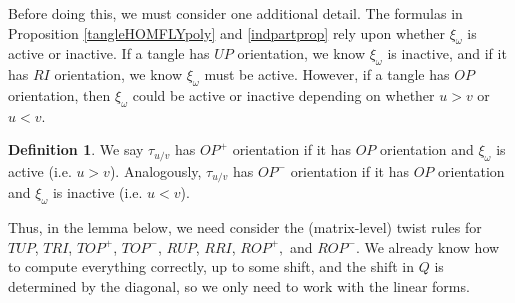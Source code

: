 \documentclass[11pt]{amsart}
\theoremstyle{plain}
\theoremstyle{definition}
\newtheorem{definitionN}[theoremN]{Definition}
\theoremstyle{remark}
\begin{document}
Before doing this, we must consider one additional detail. The formulas in Proposition \ref{tangleHOMFLYpoly} and \ref{indpartprop} rely upon whether $\xi_\omega$ is active or inactive. If a tangle has $UP$ orientation, we know $\xi_\omega$ is inactive, and if it has $RI$ orientation, we know $\xi_\omega$ must be active. However, if a tangle has $OP$ orientation, then $\xi_\omega$ could be active or inactive depending on whether $u> v$ or $u<v$. 

\begin{definitionN}
    We say $\tau_{u/v}$ has $OP^+$ orientation if it has $OP$ orientation and $\xi_\omega$ is active (i.e. $u>v$). Analogously, $\tau_{u/v}$ has $OP^-$ orientation if it has $OP$ orientation and $\xi_\omega$ is inactive (i.e. $u<v$).
\end{definitionN}

Thus, in the lemma below, we need consider the (matrix-level) twist rules for $TUP$, $TRI$, $TOP^+$, $TOP^-$, $RUP$, $RRI$, $ROP^+,$ and $ROP^-$. We already know how to compute everything correctly, up to some shift, and the shift in $Q$ is determined by the diagonal, so we only need to work with the linear forms.
\end{document}
